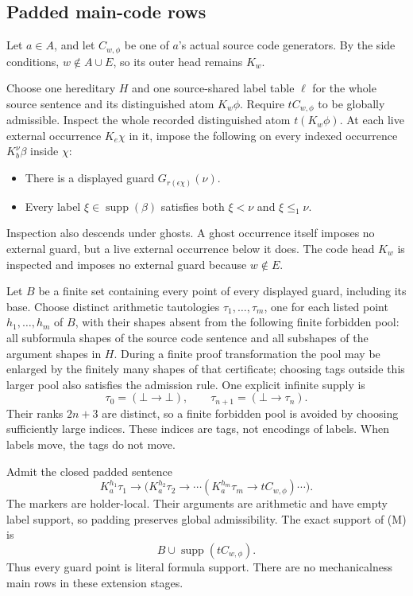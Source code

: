 \documentclass[
  11pt,
  letterpaper,
]{article}
\providecommand{\tightlist}{%
  \setlength{\itemsep}{0pt}\setlength{\parskip}{0pt}}
\begin{document}
\subsection{Padded main-code rows}\label{padded-main-code-rows}

Let \(a\in A\), and let \(C_{w,\phi}\) be one of \(a\)'s actual source
code generators. By the side conditions, \(w\notin A\cup E\), so its
outer head remains \(K_w\).

Choose one hereditary \(H\) and one source-shared label table \(\ell\)
for the whole source sentence and its distinguished atom \(K_w\phi\).
Require \(tC_{w,\phi}\) to be globally admissible. Inspect the whole
recorded distinguished atom \(t(K_w\phi)\). At each live external
occurrence \(K_e\chi\) in it, impose the following on every indexed
occurrence \(K_b^\nu\beta\) inside \(\chi\):

\begin{itemize}
\tightlist
\item
  There is a displayed guard \(G_{r(\epsilon\chi)}(\nu)\).
\item
  Every label \(\xi\in\operatorname{supp}(\beta)\) satisfies both
  \(\xi<\nu\) and \(\xi\leq_1\nu\).
\end{itemize}

Inspection also descends under ghosts. A ghost occurrence itself imposes
no external guard, but a live external occurrence below it does. The
code head \(K_w\) is inspected and imposes no external guard because
\(w\notin E\).

Let \(B\) be a finite set containing every point of every displayed
guard, including its base. Choose distinct arithmetic tautologies
\(\tau_1,\ldots,\tau_m\), one for each listed point \(h_1,\ldots,h_m\)
of \(B\), with their shapes absent from the following finite forbidden
pool: all subformula shapes of the source code sentence and all
subshapes of the argument shapes in \(H\). During a finite proof
transformation the pool may be enlarged by the finitely many shapes of
that certificate; choosing tags outside this larger pool also satisfies
the admission rule. One explicit infinite supply is \[
\tau_0=(\bot\to\bot),\qquad \tau_{n+1}=(\bot\to\tau_n).
\] Their ranks \(2n+3\) are distinct, so a finite forbidden pool is
avoided by choosing sufficiently large indices. These indices are tags,
not encodings of labels. When labels move, the tags do not move.

Admit the closed padded sentence \[
K_a^{h_1}\tau_1\to
\bigl(K_a^{h_2}\tau_2\to\cdots
(K_a^{h_m}\tau_m\to tC_{w,\phi})\cdots\bigr).
\tag{M}
\] The markers are holder-local. Their arguments are arithmetic and have
empty label support, so padding preserves global admissibility. The
exact support of (M) is \[
B\cup\operatorname{supp}(tC_{w,\phi}).
\] Thus every guard point is literal formula support. There are no
mechanicalness main rows in these extension stages.
\end{document}
